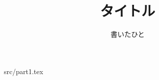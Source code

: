 \documentclass[11pt,a4paper]{jsarticle}
\title {タイトル}
\author {書いたひと}
\begin{document}
\maketitle
\newpage
 {src/part1.tex}
\end{document}
